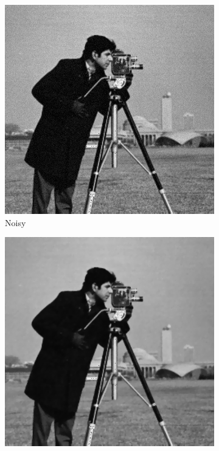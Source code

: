 \documentclass[11pt]{article}
\begin{document}
\begin{figure}
\centering
\graphicspath{{images/}}
\begin{subfigure}[b]{0.4\textwidth}
\centering
\includegraphics[width=\textwidth]{cameraman_10}
\caption{Noisy}
\label{camera:noise}
\end{subfigure}
\begin{subfigure}[b]{0.4\textwidth}
\centering
\includegraphics[width=\textwidth]{cameraman_10_ch}

\end{subfigure}
\end{figure}
\end{document}
